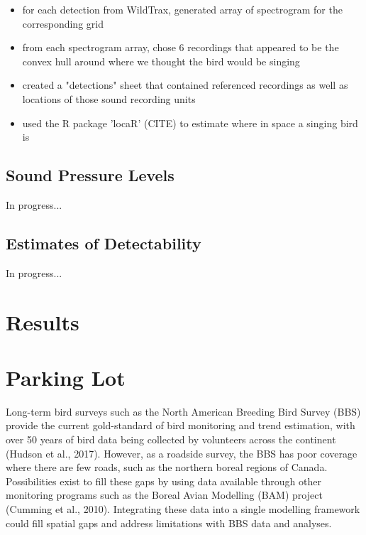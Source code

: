 \documentclass[12pt]{article}
\begin{document}
\begin{itemize}
	\item for each detection from WildTrax, generated array of spectrogram for the corresponding grid
	\item from each spectrogram array, chose 6 recordings that appeared to be the convex hull around where we thought the bird would be singing
	\item created a "detections" sheet that contained referenced recordings as well as locations of those sound recording units
	\item used the R package 'locaR' (CITE) to estimate where in space a singing bird is
\end{itemize}

\subsection{Sound Pressure Levels}

In progress...

\subsection{Estimates of Detectability}

In progress...

\section{Results}



\section{Parking Lot}
Long-term bird surveys such as the North American Breeding Bird Survey (BBS) provide the current gold-standard of bird monitoring and trend estimation, with over 50 years of bird data being collected by volunteers across the continent (Hudson et al., 2017). However, as a roadside survey, the BBS has poor coverage where there are few roads, such as the northern boreal regions of Canada. Possibilities exist to fill these gaps by using data available through other monitoring programs such as the Boreal Avian Modelling (BAM) project (Cumming et al., 2010). Integrating these data into a single modelling framework could fill spatial gaps and address limitations with BBS data and analyses. 
\end{document}
